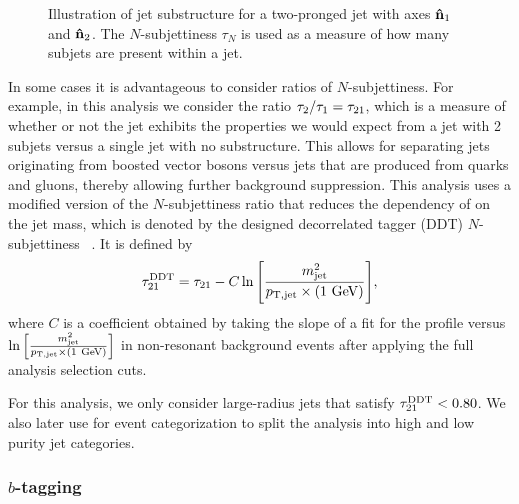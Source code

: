 \begin{figure}[htbp]
  \centering
  
  \caption{
    Illustration of jet substructure for a two-pronged jet with axes $\vb{\hat{n}}_1$ and $\vb{\hat{n}}_2$.
    The $N$-subjettiness $\tau_N$ is used as a measure of how many subjets are present within a jet.
  }
  \label{fig:jetSubstruct}
\end{figure}

In some cases it is advantageous to consider ratios of $N$-subjettiness.
For example, in this analysis we consider the ratio $\tau_2/\tau_1=\tau_{21}$, which is a measure of whether or not the jet exhibits the properties we would expect from a jet with 2 subjets versus a single jet with no substructure.
This allows for separating jets originating from boosted vector bosons versus jets that are produced from quarks and gluons, thereby allowing further background suppression.
This analysis uses a modified version of the $N$-subjettiness ratio that reduces the dependency of \nsubj on the jet mass, which is denoted by the designed decorrelated tagger (DDT) $N$-subjettiness \nsubjDDT~\cite{Dolen_2016}.
It is defined by
\begin{equation}
  \nsubjDDT=\nsubj-C\ln\bqty{\frac{\MJ^2}{\ptjet\times(1\unit{GeV})}},
\end{equation}
where $C$ is a coefficient obtained by taking the slope of a fit for the \nsubj profile versus $\ln\bqty{\frac{\MJ^2}{\ptjet\times(1\unit{GeV})}}$ in non-resonant \Wjets background events after applying the full analysis selection cuts.

For this analysis, we only consider large-radius jets that satisfy $\tau_{21}^\mathrm{DDT}<0.80$.
We also later use \nsubjDDT for event categorization to split the analysis into high and low purity jet categories.

\subsubsection{$b$-tagging}


